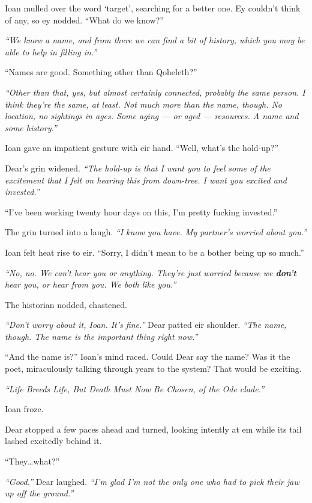 Ioan mulled over the word `target', searching for a better one. Ey couldn't think of any, so ey nodded. ``What do we know?''

\emph{``We know a name, and from there we can find a bit of history, which you may be able to help in filling in.''}

``Names are good. Something other than Qoheleth?''

\emph{``Other than that, yes, but almost certainly connected, probably the same person. I think they're the same, at least. Not much more than the name, though. No location, no sightings in ages. Some aging — or aged — resources. A name and some history.''}

Ioan gave an impatient gesture with eir hand. ``Well, what's the hold-up?''

Dear's grin widened. \emph{``The hold-up is that I want you to feel some of the excitement that I felt on hearing this from down-tree. I want you excited and invested.''}

``I've been working twenty hour days on this, I'm pretty fucking invested.''

The grin turned into a laugh. \emph{``I know you have. My partner's worried about you.''}

Ioan felt heat rise to eir. ``Sorry, I didn't mean to be a bother being up so much.''

\emph{``No, no. We can't hear you or anything. They're just worried because we \textbf{don't} hear you, or hear from you. We both like you.''}

The historian nodded, chastened.

\emph{``Don't worry about it, Ioan. It's fine.''} Dear patted eir shoulder. \emph{``The name, though. The name is the important thing right now.''}

``And the name is?'' Ioan's mind raced. Could Dear say the name? Was it the poet, miraculously talking through years to the system? That would be exciting.

\emph{``Life Breeds Life, But Death Must Now Be Chosen, of the Ode clade.''}

Ioan froze.

Dear stopped a few paces ahead and turned, looking intently at em while its tail lashed excitedly behind it.

``They\ldots{}what?''

\emph{``Good.''} Dear laughed. \emph{``I'm glad I'm not the only one who had to pick their jaw up off the ground.''}

